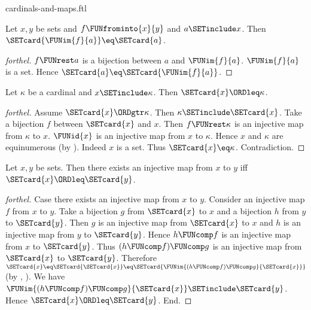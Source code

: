 \documentclass{naproche-library}
\begin{document}
\begin{smodule}[title=Cardinal Numbers and Maps]{cardinals-and-maps.ftl}

\begin{proposition}[forthel,id=SET_THEORY_06_5513850721927168]
  Let $x, y$ be sets and $f \FUNfrominto{x}{y}$ and $a \SETinclude x$.
  Then $\SETcard{\FUNim{f}{a}} \eq \SETcard{a}$.
\end{proposition}
\begin{proof}[forthel]
  $f \FUNrest a$ is a bijection between $a$ and $\FUNim{f}{a}$.
  $\FUNim{f}{a}$ is a set.
  Hence $\SETcard{a} \eq \SETcard{\FUNim{f}{a}}$.
\end{proof}

\begin{proposition}[forthel,id=SET_THEORY_06_6702394681735923]
  Let $\kappa$ be a cardinal and $x \SETinclude \kappa$.
  Then $\SETcard{x} \ORDleq \kappa$.
\end{proposition}
\begin{proof}[forthel]
  Assume $\SETcard{x} \ORDgtr \kappa$.
  Then $\kappa \SETinclude \SETcard{x}$.
  Take a bijection $f$ between $\SETcard{x}$ and $x$.
  Then $f \FUNrest \kappa$ is an injective map from $\kappa$ to $x$.
  $\FUNid{x}$ is an injective map from $x$ to $\kappa$.
  Hence $x$ and $\kappa$ are equinumerous (by ).
  Indeed $x$ is a set.
  Thus $\SETcard{x} \eq \kappa$.
  Contradiction.
\end{proof}

\begin{proposition}[forthel,id=SET_THEORY_06_407116133171200]
  Let $x, y$ be sets.
  Then there exists an injective map from $x$ to $y$ iff $\SETcard{x} \ORDleq \SETcard{y}$.
\end{proposition}
\begin{proof}[forthel]
  Case there exists an injective map from $x$ to $y$.
    Consider an injective map $f$ from $x$ to $y$.
    Take a bijection $g$ from $\SETcard{x}$ to $x$ and a bijection $h$ from $y$ to $\SETcard{y}$.
    Then $g$ is an injective map from $\SETcard{x}$ to $x$ and $h$ is an injective map from $y$ to $\SETcard{y}$.
    Hence $h \FUNcomp f$ is an injective map from $x$ to $\SETcard{y}$.
    Thus $(h \FUNcomp f) \FUNcomp g$ is an injective map from $\SETcard{x}$ to $\SETcard{y}$.
    Therefore $\SETcard{x}
      \eq \SETcard{\SETcard{x}}
      \eq \SETcard{\FUNim{(h \FUNcomp f) \FUNcomp g}{\SETcard{x}}}$
    (by , ).
    We have $\FUNim{(h \FUNcomp f) \FUNcomp g}{\SETcard{x}} \SETinclude \SETcard{y}$.
    Hence $\SETcard{x} \ORDleq \SETcard{y}$.
  End.


\end{proof}
\end{smodule}
\end{document}
